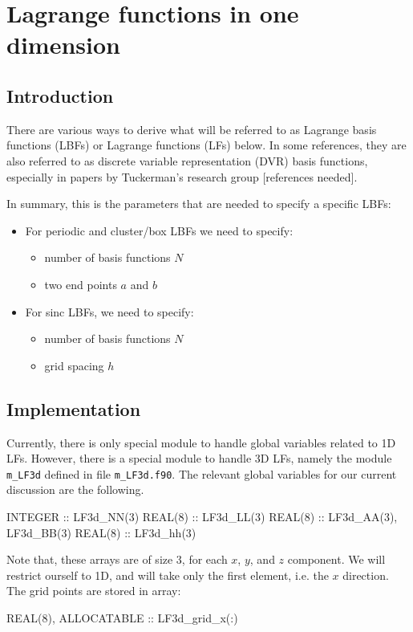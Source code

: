 \chapter{Lagrange functions in one dimension}


\section{Introduction}

There are various ways to derive what will be referred to as
Lagrange basis functions (LBFs) or Lagrange functions (LFs) below.
In some references, they are also referred to as discrete variable
representation (DVR) basis functions, especially in papers by Tuckerman's
research group [references needed].

In summary, this is the parameters that are needed to specify a specific
LBFs:
\begin{itemize}

\item For periodic and cluster/box LBFs we need to specify:
\begin{itemize}
\item number of basis functions $N$
\item two end points $a$ and $b$
\end{itemize}

\item For sinc LBFs, we need to specify:
\begin{itemize}
\item number of basis functions $N$
\item grid spacing $h$
\end{itemize}

\end{itemize}


\section{Implementation}

Currently, there is only special module to handle global variables related
to 1D LFs. However, there is a special module to handle 3D LFs, namely
the module \texttt{m\_LF3d} defined in file \texttt{m\_LF3d.f90}.
The relevant global variables for our current discussion are the following.
\begin{fortrancode}
INTEGER :: LF3d_NN(3)
REAL(8) :: LF3d_LL(3)
REAL(8) :: LF3d_AA(3), LF3d_BB(3)
REAL(8) :: LF3d_hh(3)
\end{fortrancode}
Note that, these arrays are of size 3, for each $x$, $y$, and $z$ component.
We will restrict ourself to 1D, and will take only the first element, i.e. the
$x$ direction.
The grid points are stored in array:
\begin{fortrancode}
REAL(8), ALLOCATABLE :: LF3d_grid_x(:)
\end{fortrancode}

